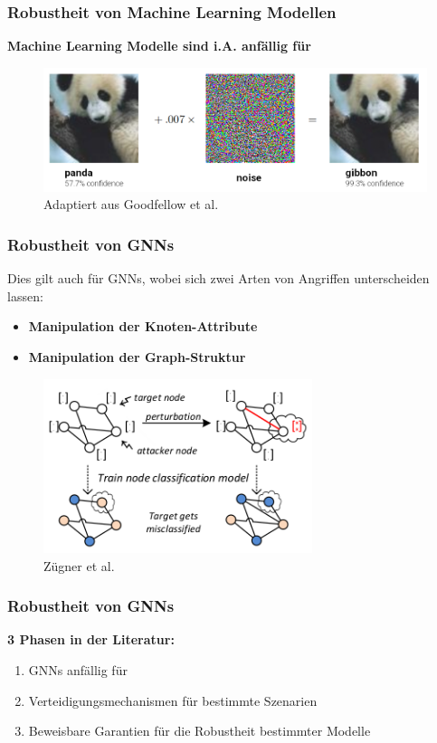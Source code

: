 \documentclass{beamer}
\begin{document}
\begin{frame}
  \frametitle{Robustheit von Machine Learning Modellen}

  \textbf{Machine Learning Modelle sind i.A. anfällig für }

  \begin{figure}
    \centering
    \includegraphics[width=\textwidth]{img/adversarial.png}
    \caption*{Adaptiert aus Goodfellow et al. \cite{Goodfellow_2015}}
  \end{figure}
\end{frame}

\begin{frame}
  \frametitle{Robustheit von GNNs}
  Dies gilt auch für GNNs, wobei sich zwei Arten von Angriffen unterscheiden lassen:
  \begin{itemize}
    \item \textbf{Manipulation der Knoten-Attribute}
    \item \textbf{Manipulation der Graph-Struktur}
  \end{itemize}
  \begin{figure}
    \centering
    \includegraphics[width=0.7\textwidth]{img/adversarial_GNN.png}
    \caption*{Zügner et al. \cite{Zuegner_2018}}
  \end{figure}
\end{frame}

\begin{frame}
  \frametitle{Robustheit von GNNs}
  \textbf{3 Phasen in der Literatur:}
  \begin{enumerate}
    \item GNNs anfällig für 
    \item Verteidigungsmechanismen für bestimmte Szenarien
    \item Beweisbare Garantien für die Robustheit bestimmter Modelle
  \end{enumerate}
\end{frame}
\end{document}
